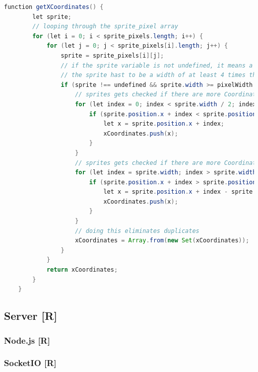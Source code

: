 \begin{lstlisting}[caption=Bestimmung gültiger X-Koordinaten,language=Java,label=lst:impl:xCoords]
    function getXCoordinates() {
        let sprite;
        // looping through the sprite_pixel array
        for (let i = 0; i < sprite_pixels.length; i++) {
            for (let j = 0; j < sprite_pixels[i].length; j++) {
                sprite = sprite_pixels[i][j];
                // if the sprite variable is not undefined, it means a sprite exists there
                // the sprite hast to be a width of at least 4 times the normal pixel width
                if (sprite !== undefined && sprite.width >= pixelWidth * 4) {
                    // sprites gets checked if there are more Coordinates to let an item spawn there (to the right of the center)
                    for (let index = 0; index < sprite.width / 2; index += pixelWidth * 2) {
                        if (sprite.position.x + index < sprite.position.x + sprite.width / 2) {
                            let x = sprite.position.x + index;
                            xCoordinates.push(x);
                        }
                    }
                    // sprites gets checked if there are more Coordinates to let an item spawn there (to the left of the center)
                    for (let index = sprite.width; index > sprite.width / 2; index -= pixelWidth * 2) {
                        if (sprite.position.x + index > sprite.position.x + sprite.width / 2) {
                            let x = sprite.position.x + index - sprite.width;
                            xCoordinates.push(x);
                        }
                    }
                    // doing this eliminates duplicates
                    xCoordinates = Array.from(new Set(xCoordinates));
                }
            }
            return xCoordinates;
        }
    }
\end{lstlisting}






\subsection{Server [R]}
\subsubsection{Node.js [R]}
\subsubsection{SocketIO [R]}
